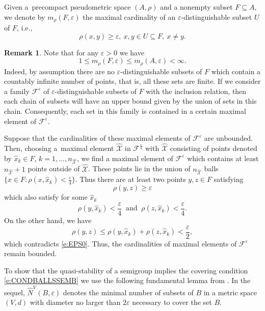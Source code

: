 \documentclass[a4paper,12pt,reqno]{amsart}
\theoremstyle{plain}
\theoremstyle{definition}
\newtheorem{rem}[lem]{Remark}
\numberwithin{equation}{section}
\newcommand{\eps}{\varepsilon}
\renewcommand{\geq}{\geqslant}
\renewcommand{\leq}{\leqslant}
\begin{document}
Given a~precompact pseudometric space $(A,\rho)$ and a nonempty subset $F\subseteq A$, we denote by $m_{\rho}(F,\eps)$  the maximal cardinality of an $\eps$-distinguishable subset $U$ of $F$, i.e.,
\begin{equation*}
\rho(x,y)\geq\eps,\ x,y\in U\subseteq F,\ x\neq y.
\end{equation*}

\begin{rem}
Note that for any $\eps>0$ we have
$$1\leq m_{\rho}(F,\eps)\leq m_{\rho}(A,\eps)<\infty.$$
Indeed, by assumption there are no $\eps$-distinguishable subsets of $F$
which contain a countably infinite number of points, that is, all these sets are finite.
If we consider a family ${\mathcal F}^{\eps}$ of $\eps$-distinguishable subsets of $F$ with the inclusion relation, then
each chain of subsets will have an upper bound given by the union of sets in this chain. Consequently,
each set in this family is contained in a certain maximal element of ${\mathcal F}^{\eps}$.

Suppose that the cardinalities of these maximal elements of ${\mathcal F}^{\eps}$ are unbounded. Then, choosing a~maximal element
$\hat {\mathcal X}$ in ${\mathcal F}^{\frac{\eps}{4}}$ with $\hat {\mathcal X}$ consisting of points denoted by
$\hat x_{k}\in F$, $k=1,\ldots, n_{\hat {\mathcal X}}$, we find a maximal element of ${\mathcal F}^{\eps}$ which contains at least
$n_{\hat {\mathcal X}}+1$ points outside of $\hat {\mathcal X}$. These points lie in the union of $n_{\hat {\mathcal X}}$ balls
$\{x\in F\colon\rho(x,\hat x_{k})<\frac{\eps}{4}\}$. Thus there are at least two points $y,z\in F$ satisfying
\begin{equation}\label{e:EPS0}
\rho(y,z)\geq \eps
\end{equation}
which also satisfy for some $\hat x_{k}$
$$\rho(y,\hat x_{k})<\frac{\eps}{4}\ \text{ and } \ \rho(z, \hat x_{k})< \frac{\eps}{4}.$$
On the other hand, we have
$$\rho(y, z) \leq \rho(y, \hat x_{k}) + \rho(z, \hat x_{k})<\frac{\eps}{2},$$
which contradicts \eqref{e:EPS0}. Thus, the cardinalities of maximal elements of ${\mathcal F}^{\eps}$ remain bounded.
\end{rem}

To show that the quasi-stability of a semigroup implies the covering condition \eqref{e:CONDBALLSSEMB}
we use the following fundamental lemma from \cite[p.~25]{cl2008}.
In the sequel, $\widehat{N}^{V}(B,\eps)$ denotes the minimal number of subsets of $B$ in a metric space $(V,d)$ with diameter no larger than $2\eps$ necessary to cover the set $B$. 
\end{document}
